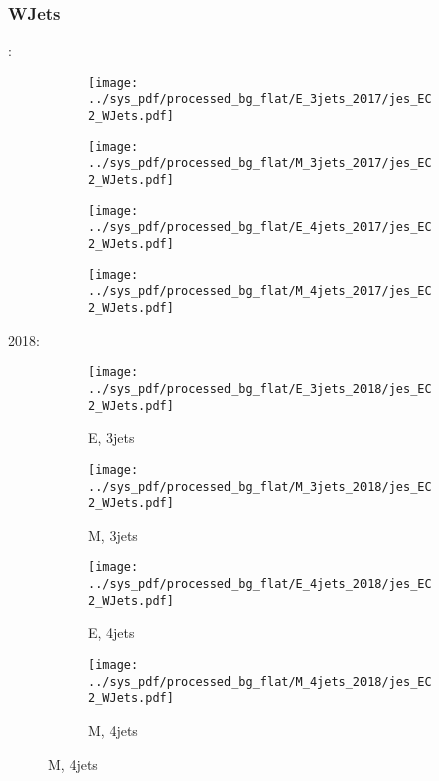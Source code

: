 \documentclass{beamer}
\begin{document}
\begin{frame}
\frametitle{WJets}
\fontsize{5}{1}:
\begin{figure}
\centering
\begin{subfigure}[b]{0.24\textwidth}
\texttt{[image: ../sys\_pdf/processed\_bg\_flat/E\_3jets\_2017/jes\_EC2\_WJets.pdf]}
\end{subfigure}
\begin{subfigure}[b]{0.24\textwidth}
\texttt{[image: ../sys\_pdf/processed\_bg\_flat/M\_3jets\_2017/jes\_EC2\_WJets.pdf]}
\end{subfigure}
\begin{subfigure}[b]{0.24\textwidth}
\texttt{[image: ../sys\_pdf/processed\_bg\_flat/E\_4jets\_2017/jes\_EC2\_WJets.pdf]}
\end{subfigure}
\begin{subfigure}[b]{0.24\textwidth}
\texttt{[image: ../sys\_pdf/processed\_bg\_flat/M\_4jets\_2017/jes\_EC2\_WJets.pdf]}
\end{subfigure}
\end{figure}
2018:
\begin{figure}
\centering
\begin{subfigure}[b]{0.24\textwidth}
\texttt{[image: ../sys\_pdf/processed\_bg\_flat/E\_3jets\_2018/jes\_EC2\_WJets.pdf]}
\captionsetup{font=tiny}
\caption{E, 3jets}
\end{subfigure}
\begin{subfigure}[b]{0.24\textwidth}
\texttt{[image: ../sys\_pdf/processed\_bg\_flat/M\_3jets\_2018/jes\_EC2\_WJets.pdf]}
\captionsetup{font=tiny}
\caption{M, 3jets}
\end{subfigure}
\begin{subfigure}[b]{0.24\textwidth}
\texttt{[image: ../sys\_pdf/processed\_bg\_flat/E\_4jets\_2018/jes\_EC2\_WJets.pdf]}
\captionsetup{font=tiny}
\caption{E, 4jets}
\end{subfigure}
\begin{subfigure}[b]{0.24\textwidth}
\texttt{[image: ../sys\_pdf/processed\_bg\_flat/M\_4jets\_2018/jes\_EC2\_WJets.pdf]}
\captionsetup{font=tiny}
\caption{M, 4jets}
\end{subfigure}
\end{figure}
\end{frame}
\end{document}
